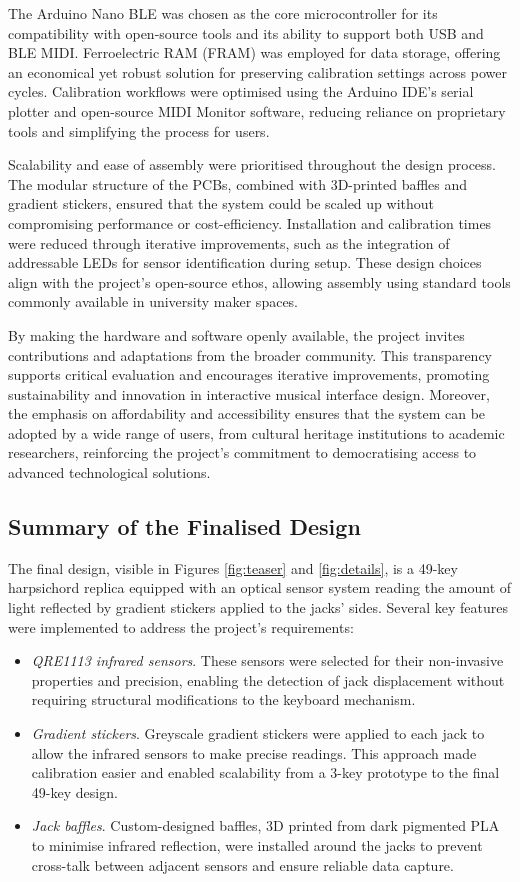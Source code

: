 The Arduino Nano BLE was chosen as the core microcontroller for its compatibility with open-source tools and its ability to support both USB and BLE MIDI. Ferroelectric RAM (FRAM) was employed for data storage, offering an economical yet robust solution for preserving calibration settings across power cycles. Calibration workflows were optimised using the Arduino IDE’s serial plotter and open-source MIDI Monitor software, reducing reliance on proprietary tools and simplifying the process for users.

Scalability and ease of assembly were prioritised throughout the design process. The modular structure of the PCBs, combined with 3D-printed baffles and gradient stickers, ensured that the system could be scaled up without compromising performance or cost-efficiency. Installation and calibration times were reduced through iterative improvements, such as the integration of addressable LEDs for sensor identification during setup. These design choices align with the project’s open-source ethos, allowing assembly using standard tools commonly available in university maker spaces.

By making the hardware and software openly available, the project invites contributions and adaptations from the broader community. This transparency supports critical evaluation and encourages iterative improvements, promoting sustainability and innovation in interactive musical interface design. Moreover, the emphasis on affordability and accessibility ensures that the system can be adopted by a wide range of users, from cultural heritage institutions to academic researchers, reinforcing the project’s commitment to democratising access to advanced technological solutions.


\subsection{Summary of the Finalised Design}

The final design, visible in Figures \ref{fig:teaser} and \ref{fig:details}, is a 49-key harpsichord replica equipped with an optical sensor system reading the amount of light reflected by gradient stickers applied to the jacks' sides. Several key features were implemented to address the project’s requirements:

\begin{itemize}
\item \emph{QRE1113 infrared sensors}. These sensors were selected for their non-invasive properties and precision, enabling the detection of jack displacement without requiring structural modifications to the keyboard mechanism.
\item \emph{Gradient stickers}. Greyscale gradient stickers were applied to each jack to allow the infrared sensors to make precise readings. This approach made calibration easier and enabled scalability from a 3-key prototype to the final 49-key design.
\item \emph{Jack baffles}. Custom-designed baffles, 3D printed from dark pigmented PLA to minimise infrared reflection, were installed around the jacks to prevent cross-talk between adjacent sensors and ensure reliable data capture.
\end{itemize}

